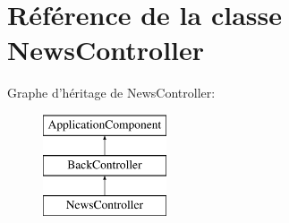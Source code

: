 \hypertarget{class_applications_1_1_backend_1_1_modules_1_1_news_1_1_news_controller}{\section{Référence de la classe News\+Controller}
\label{class_applications_1_1_backend_1_1_modules_1_1_news_1_1_news_controller}
}
Graphe d'héritage de News\+Controller\+:\begin{figure}[H]
\begin{center}
\leavevmode
\includegraphics[height=3.000000cm]{class_applications_1_1_backend_1_1_modules_1_1_news_1_1_news_controller}
\end{center}
\end{figure}
